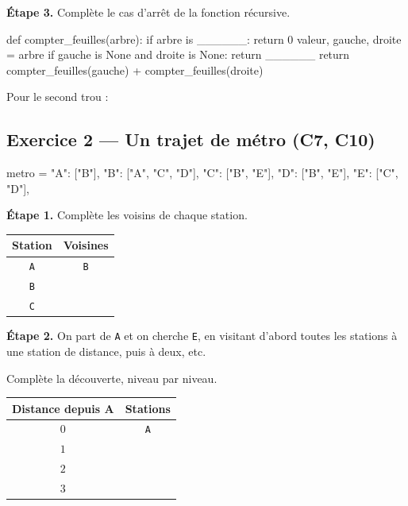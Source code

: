 \medskip
\dotfill

\bigskip

\textbf{Étape 3.} Complète le cas d'arrêt de la fonction récursive.

\begin{python}
def compter_feuilles(arbre):
    if arbre is ______:
        return 0
    valeur, gauche, droite = arbre
    if gauche is None and droite is None:
        return ______
    return compter_feuilles(gauche) + compter_feuilles(droite)
\end{python}

\medskip
Pour le second trou :  \qquad {} \qquad {}

\bigskip
\bigskip

\subsection*{Exercice 2 --- Un trajet de métro (C7, C10)}

\begin{python}
metro = {
    "A": ["B"],
    "B": ["A", "C", "D"],
    "C": ["B", "E"],
    "D": ["B", "E"],
    "E": ["C", "D"],
}
\end{python}

\bigskip

\textbf{Étape 1.} Complète les voisins de chaque station.

\bigskip

\begin{center}
\begin{tabular}{|c|c|}
\hline
\textbf{Station} & \textbf{Voisines} \\
\hline
\texttt{A} & \texttt{B} \\
\hline
\texttt{B} & \dotfill \\
\hline
\texttt{C} & \dotfill \\
\hline
\end{tabular}
\end{center}

\bigskip

\textbf{Étape 2.} On part de \texttt{A} et on cherche \texttt{E}, en visitant
d'abord toutes les stations à une station de distance, puis à deux, etc.

\medskip
Complète la découverte, niveau par niveau.

\bigskip

\begin{center}
\begin{tabular}{|c|c|}
\hline
\textbf{Distance depuis A} & \textbf{Stations} \\
\hline
$0$ & \texttt{A} \\
\hline
$1$ & \dotfill \\
\hline
$2$ & \dotfill \\
\hline
$3$ & \dotfill \\
\hline
\end{tabular}
\end{center}

